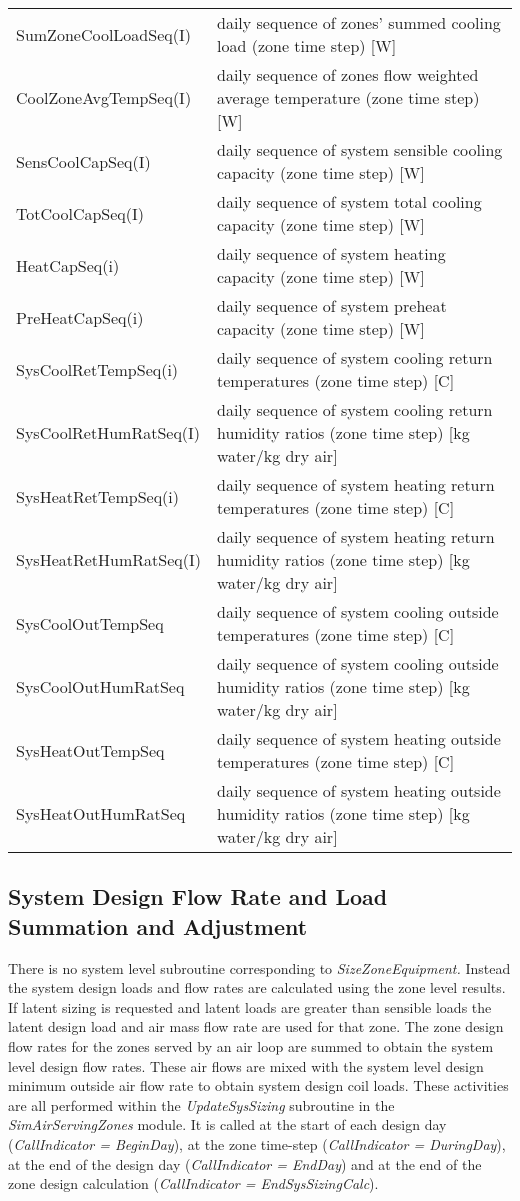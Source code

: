 \begin{longtable}[c]{p{2.0in}p{4.0in}}
SumZoneCoolLoadSeq(I) & daily sequence of zones' summed cooling load (zone time step) [W] \tabularnewline
CoolZoneAvgTempSeq(I) & daily sequence of zones flow weighted average temperature (zone time step) [W] \tabularnewline
SensCoolCapSeq(I) & daily sequence of system sensible cooling capacity (zone time step) [W] \tabularnewline
TotCoolCapSeq(I) & daily sequence of system total cooling capacity (zone time step) [W] \tabularnewline
HeatCapSeq(i) & daily sequence of system heating capacity (zone time step) [W] \tabularnewline
PreHeatCapSeq(i) & daily sequence of system preheat capacity (zone time step) [W] \tabularnewline
SysCoolRetTempSeq(i) & daily sequence of system cooling return temperatures (zone time step) [C] \tabularnewline
SysCoolRetHumRatSeq(I) & daily sequence of system cooling return humidity ratios (zone time step) [kg water/kg dry air] \tabularnewline
SysHeatRetTempSeq(i) & daily sequence of system heating return temperatures (zone time step) [C] \tabularnewline
SysHeatRetHumRatSeq(I) & daily sequence of system heating return humidity ratios (zone time step) [kg water/kg dry air] \tabularnewline
SysCoolOutTempSeq & daily sequence of system cooling outside temperatures (zone time step) [C] \tabularnewline
SysCoolOutHumRatSeq & daily sequence of system cooling outside humidity ratios (zone time step) [kg water/kg dry air] \tabularnewline
SysHeatOutTempSeq & daily sequence of system heating outside temperatures (zone time step) [C] \tabularnewline
SysHeatOutHumRatSeq & daily sequence of system heating outside humidity ratios (zone time step) [kg water/kg dry air] \tabularnewline
\bottomrule
\end{longtable}

\subsection{System Design Flow Rate and Load Summation and Adjustment}\label{system-design-flow-rate-and-load-summation-and-adjustment}

There is no system level subroutine corresponding to \emph{SizeZoneEquipment.} Instead the system design loads and flow rates are calculated using the zone level results. If latent sizing is requested and latent loads are greater than sensible loads the latent design load and air mass flow rate are used for that zone. The zone design flow rates for the zones served by an air loop are summed to obtain the system level design flow rates. These air flows are mixed with the system level design minimum outside air flow rate to obtain system design coil loads. These activities are all performed within the \emph{UpdateSysSizing} subroutine in the \emph{SimAirServingZones} module. It is called at the start of each design day (\emph{CallIndicator = BeginDay}), at the zone time-step (\emph{CallIndicator = DuringDay}), at the end of the design day (\emph{CallIndicator = EndDay}) and at the end of the zone design calculation (\emph{CallIndicator = EndSysSizingCalc}).

